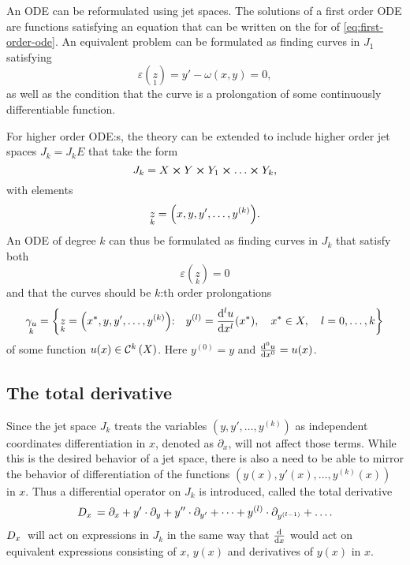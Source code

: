 An ODE can be reformulated using jet spaces.
The solutions of a first order ODE are functions satisfying an equation that can be written on the for of \cref{eq:first-order-ode}.
An equivalent problem can be formulated as finding curves in \(J_1\) satisfying
\begin{equation} \label{eq:first-order-jet-ode}
  \varepsilon(\underset{1}{z}) = y' - \omega(x,y) = 0,
\end{equation}
as well as the condition that the curve is a prolongation of some continuously differentiable function.

For higher order ODE:s, the theory can be extended to include higher order jet spaces \(J_k = J_k E\) that take the form
\begin{equation}
  J_k = X \cross Y \cross Y_1 \cross \dots \cross Y_k,
\end{equation}
with elements
\begin{equation}
  \underset{k}{z} = \qty(x, y, y', \dots, y^{(k)}).
\end{equation}
An ODE of degree \(k\) can thus be formulated as finding curves in \(J_k\) that satisfy both
\begin{equation}
  \varepsilon(\underset{k}{z}) = 0
\end{equation}
and that the curves should be \(k\):th order prolongations
\begin{equation}
  \underset{k}{\gamma_u} = \qty{\underset{k}{z} = \qty(\fixed{x}, y, y', \dots, y^{(k)})\qq*{:} y^{(l)} = \dv[l]{u}{x}{(\fixed{x})}\qc \fixed{x} \in X\qc l = 0, \dots, k}
\end{equation}
of some function \(u(x) \in \cont{k}{X}\).
Here \(y^{(0)} = y\) and \(\dv[0]{u}{x} = u(x)\).

\subsection{The total derivative}

Since the jet space \(J_k\) treats the variables \((y, y', \dots, y^{(k)})\) as independent coordinates differentiation in \(x\), denoted as \(\partial_x\), will not affect those terms.
While this is the desired behavior of a jet space, there is also a need to be able to mirror the behavior of differentiation of the functions \((y(x), y'(x), \dots, y^{(k)}(x))\) in \(x\).
Thus a differential operator on \(J_k\) is introduced, called the total derivative
\begin{equation}
  D_{x}\, = \partial_x + y' \cdot \partial_y + y'' \cdot \partial_{y'} + \dots + y^{(l)} \cdot \partial_{y^{(l-1)}} + \dots .
\end{equation}
\(D_{x}\,\) will act on expressions in \(J_k\) in the same way that \(\dv{x}\) would act on equivalent expressions consisting of \(x\), \(y(x)\) and derivatives of \(y(x)\) in \(x\).


